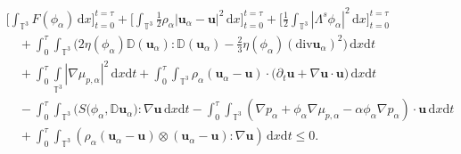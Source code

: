 \documentclass[reqno,a4paper,11pt]{amsart}
\theoremstyle{plain}
\numberwithin{equation}{section}
\renewcommand{\d}{\mathrm{d}}
\newcommand{\dx}{\d x}
\newcommand{\dxdt}{\,\d x \d t}
\newcommand{\dt}{\d t}
\begin{document}
				\begin{align}
					&\bigg[\int_{\mathbb{T}^{3}}F(\phi_{\alpha})\,\dx\bigg]_{t=0}^{t=\tau}
					+ \bigg[\int_{\mathbb{T}^{3}}\frac{1}{2}\rho_{\alpha} |\mathbf{u}_{\alpha}-\mathbf{u}|^{2}\,\dx\bigg]_{t=0}^{t=\tau}
					+
					\bigg[\frac{1}{2}\int_{\mathbb{T}^{3}} |\Lambda^{s}\phi_{\alpha}|^{2}\,\dx\bigg]_{t=0}^{t=\tau}
					\nonumber \\&\quad
					+\int_0^{\tau}\int_{\mathbb{T}^{3}} \big( 2 \eta(\phi_{\alpha})
					\mathbb{ D}(\mathbf{u}_{\alpha}):\mathbb{ D}(\mathbf{u}_{\alpha})-\frac{2}{3}\eta(\phi_{\alpha}) (\mathrm{div} \mathbf{u}_{\alpha})^2\big)\dxdt \nonumber \\&\quad
					+\int_0^{\tau}\int\limits_{\mathbb{T}^{3}}|\nabla \mu_{p,\alpha}|^{2}\dxdt
					+  \int_0^\tau\int_{\mathbb{T}^{3}}\rho_{\alpha}  (\mathbf{u}_{\alpha}-\mathbf{u})\cdot\big (\partial_{t} \mathbf{u}+\nabla\mathbf{u}\cdot\mathbf{u}\big)\,\dx\dt
					\nonumber \\&\quad-  \int_0^\tau\int_{\mathbb{T}^{3}}\big(S(\phi_{\alpha},\mathbb{ D}\mathbf{u}_{\alpha}\big) : \nabla \mathbf{u}\,\dx\dt
					- \nonumber  \int_0^\tau\int_{\mathbb{T}^{3}}(\nabla p_{\alpha}+\phi_{\alpha} \nabla \mu_{p,\alpha}-\alpha\phi_{\alpha}\nabla p_{\alpha})\cdot \mathbf{u}\,\dx\dt
					\\&
					\quad +\int_0^\tau\int_{\mathbb{T}^{3}}(\rho_{\alpha} (\mathbf{u}_{\alpha}-\mathbf{u})\otimes(\mathbf{u}_{\alpha}-\mathbf{u}):\nabla \mathbf{u} )\,\dx\dt
					\leq 0.
					\label{mode54-122}
				\end{align}
				
\end{document}
